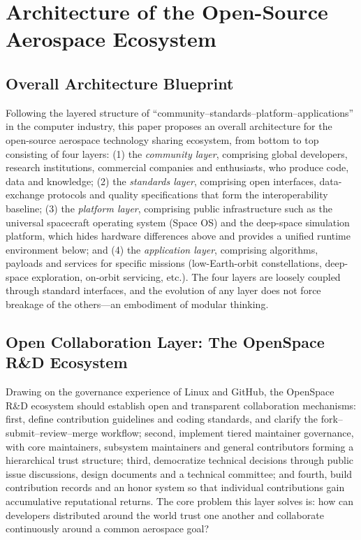 \documentclass[11pt]{article}
\begin{document}
\section{Architecture of the Open-Source Aerospace Ecosystem}
\subsection{Overall Architecture Blueprint}
Following the layered structure of ``community--standards--platform--applications'' in the computer industry, this paper proposes an overall architecture for the open-source aerospace technology sharing ecosystem, from bottom to top consisting of four layers: (1) the \emph{community layer}, comprising global developers, research institutions, commercial companies and enthusiasts, who produce code, data and knowledge; (2) the \emph{standards layer}, comprising open interfaces, data-exchange protocols and quality specifications that form the interoperability baseline; (3) the \emph{platform layer}, comprising public infrastructure such as the universal spacecraft operating system (Space OS) and the deep-space simulation platform, which hides hardware differences above and provides a unified runtime environment below; and (4) the \emph{application layer}, comprising algorithms, payloads and services for specific missions (low-Earth-orbit constellations, deep-space exploration, on-orbit servicing, etc.). The four layers are loosely coupled through standard interfaces, and the evolution of any layer does not force breakage of the others---an embodiment of modular thinking.

\subsection{Open Collaboration Layer: The OpenSpace R\&D Ecosystem}
Drawing on the governance experience of Linux and GitHub, the OpenSpace R\&D ecosystem should establish open and transparent collaboration mechanisms: first, define contribution guidelines and coding standards, and clarify the fork--submit--review--merge workflow; second, implement tiered maintainer governance, with core maintainers, subsystem maintainers and general contributors forming a hierarchical trust structure; third, democratize technical decisions through public issue discussions, design documents and a technical committee; and fourth, build contribution records and an honor system so that individual contributions gain accumulative reputational returns. The core problem this layer solves is: how can developers distributed around the world trust one another and collaborate continuously around a common aerospace goal?
\end{document}
